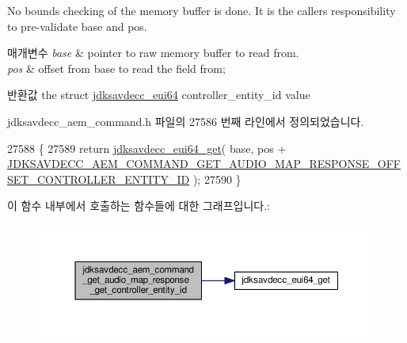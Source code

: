 No bounds checking of the memory buffer is done. It is the caller\textquotesingle{}s responsibility to pre-\/validate base and pos.


\begin{DoxyParams}{매개변수}
{\em base} & pointer to raw memory buffer to read from. \\
\hline
{\em pos} & offset from base to read the field from; \\
\hline
\end{DoxyParams}
\begin{DoxyReturn}{반환값}
the struct \hyperlink{structjdksavdecc__eui64}{jdksavdecc\+\_\+eui64} controller\+\_\+entity\+\_\+id value 
\end{DoxyReturn}


jdksavdecc\+\_\+aem\+\_\+command.\+h 파일의 27586 번째 라인에서 정의되었습니다.


\begin{DoxyCode}
27588 \{
27589     \textcolor{keywordflow}{return} \hyperlink{group__eui64_ga2652311a25a6b91cddbed75c108c7031}{jdksavdecc\_eui64\_get}( base, pos + 
      \hyperlink{group__command__get__audio__map__response_gaa9f87f45fa513ce8da5bcf482e229c6a}{JDKSAVDECC\_AEM\_COMMAND\_GET\_AUDIO\_MAP\_RESPONSE\_OFFSET\_CONTROLLER\_ENTITY\_ID}
       );
27590 \}
\end{DoxyCode}


이 함수 내부에서 호출하는 함수들에 대한 그래프입니다.\+:
\nopagebreak
\begin{figure}[H]
\begin{center}
\leavevmode
\includegraphics[width=350pt]{group__command__get__audio__map__response_gab257449f0d0df6fb56fd88d9e751724f_cgraph}
\end{center}
\end{figure}


